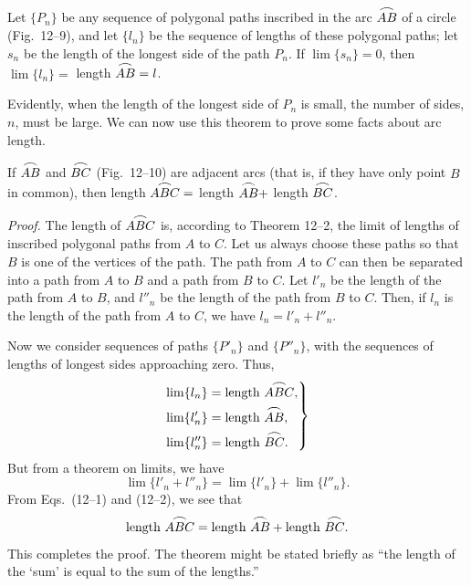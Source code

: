 \documentclass[11pt]{book}
\newcommand{\XIIarc}[1]{\overset{\raisebox{-0.25ex}{\scalebox{1.15}[0.85]{$\frown$}}}{#1}}
\begin{document}
\begin{theorem}
Let $\{P_n\}$ be any sequence of polygonal paths inscribed in the arc
$\XIIarc{AB}$ of a circle (Fig.~12--9), and let $\{l_n\}$ be the sequence of
lengths of these polygonal paths; let $s_n$ be the length of the longest side of
the path $P_n$. If $\lim \{s_n\} = 0$, then $\lim \{l_n\} = $ length
$\XIIarc{AB} = l$.
\end{theorem}

\begin{remark}
Evidently, when the length of the longest side of $P_n$ is small, the number of
sides, $n$, must be large. We can now use this theorem to prove some facts about
arc length.
\end{remark}

\begin{theorem}
If $\XIIarc{AB}$ and $\XIIarc{BC}$ (Fig.~12--10) are adjacent arcs (that is, if
they have only point $B$ in common), then length $\XIIarc{ABC} = $ length
$\XIIarc{AB} + $ length $\XIIarc{BC}$.
\end{theorem}

\FIGXIININETEN

\noindent\emph{Proof.} The length of $\XIIarc{ABC}$ is, according to
Theorem 12--2, the limit of lengths of inscribed polygonal paths from $A$ to
$C$. Let us always choose these paths so that $B$ is one of the vertices of the
path. The path from $A$ to $C$ can then be separated into a path from $A$ to $B$
and a path from $B$ to $C$. Let $l'_n$ be the length of the path from $A$ to
$B$, and $l''_n$ be the length of the path from $B$ to $C$. Then, if $l_n$ is
the length of the path from $A$ to $C$, we have $l_n = l'_n + l''_n$.

Now we consider sequences of paths $\{P'_n\}$ and $\{P''_n\}$, with the
sequences of lengths of longest sides approaching zero. Thus,
\begin{equation}
\left.
\begin{aligned}
\lim \{l_n\} &= \text{length } \XIIarc{ABC},\\
\lim \{l'_n\} &= \text{length } \XIIarc{AB},\\
\lim \{l''_n\} &= \text{length } \XIIarc{BC}.
\end{aligned}
\right\}
\end{equation}
But from a theorem on limits, we have
\begin{equation}
\lim \{l'_n + l''_n\} = \lim \{l'_n\} + \lim \{l''_n\}.
\end{equation}
From Eqs.~(12--1) and (12--2), we see that
\begin{equation}
\text{length } \XIIarc{ABC} = \text{length } \XIIarc{AB} + \text{length }
\XIIarc{BC}.
\end{equation}
This completes the proof. The theorem might be stated briefly as ``the length of
the `sum' is equal to the sum of the lengths.''
\end{document}
